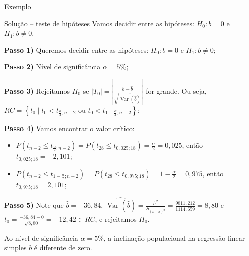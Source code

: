 \documentclass[8pt]{beamer}
\DeclareMathOperator{\vari}{Var}
\begin{document}
\begin{frame}{Exemplo}

	\begin{block}{Solução -- teste de hipóteses}
		Vamos decidir entre as hipóteses: $H_0: b=0$ e $H_1: b \neq 0$.
		
		\textbf{Passo 1)} Queremos decidir entre as hipóteses: $H_0: b = 0$  e $H_1: b \neq 0$;
		
		\textbf{Passo 2)} Nível de significância $\alpha=5\%$;
		
		\textbf{Passo 3)} Rejeitamos $H_0$ se $\lvert T_0 \rvert = \left\lvert \frac{b - \hat{b}}{\sqrt{\widehat{\vari({\hat{b}})}}} \right\rvert$ for grande. Ou seja, $RC = \left\{ t_0 \mid t_0 < t_{\frac{\alpha}{2}; n-2} \mbox{ ou } t_0 < t_{1-\frac{\alpha}{2}; n-2}  \right\}$;
		
		\textbf{Passo 4)} Vamos encontrar o valor crítico:
		\begin{itemize}
			\item $P\left(t_{n-2} \leq t_{\frac{\alpha}{2}; n-2}\right) = P\left(t_{28} \leq t_{0,025; 18}\right) = \frac{\alpha}{2} = 0,025$, então $t_{0,025; 18} =  -2,101
			$;
			\item $P\left(t_{n-2} \leq t_{1-\frac{\alpha}{2}; n-2}\right) = P\left(t_{28} \leq t_{0,975; 18}\right) = 1-\frac{\alpha}{2} = 0,975$, então $t_{0,975; 18} =  2,101
			$;
		\end{itemize}
	
		\textbf{Passo 5)} Note que $\hat{b} = -36,84$, $\widehat{\vari({\hat{b}})} = \frac{\hat{\sigma}^2}{S_{(x-\bar{x})^2}} = \frac{9811,212}{1114,659} = 8,80$ e $t_0 = \frac{-36,84 - 0}{\sqrt{8,80}} = -12,42 \in RC$, e rejeitamos $H_0$.
		
		Ao nível de significância $\alpha=5\%$, a inclinação populacional na regressão linear simples $b$ é diferente de zero.
	\end{block}


\end{frame}
\end{document}
